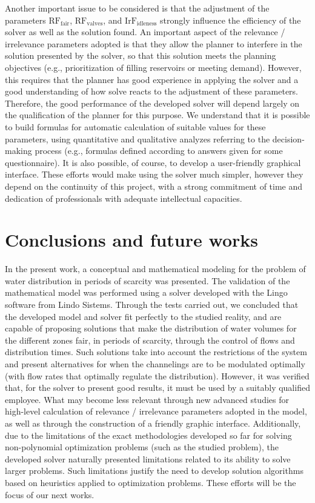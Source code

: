 \documentclass{singlecol}
\theoremstyle{TH}{
\newtheorem{lemma}{Lemma}
\newtheorem{theorem}[lemma]{Theorem}
\newtheorem{corrolary}[lemma]{Corrolary}
\newtheorem{conjecture}[lemma]{Conjecture}
\newtheorem{proposition}[lemma]{Proposition}
\newtheorem{claim}[lemma]{Claim}
\newtheorem{stheorem}[lemma]{Wrong Theorem}
\newtheorem{algorithm}{Algorithm}
}
\theoremstyle{THrm}{
\newtheorem{definition}{Definition}[section]
\newtheorem{question}{Question}[section]
\newtheorem{remark}{Remark}
\newtheorem{scheme}{Scheme}
}
\theoremstyle{THhit}{
\newtheorem{case}{Case}[section]
}
\begin{document}
Another important issue to be considered is that the adjustment of the parameters $\mathrm{RF_{fair}}$, $\mathrm{RF_{valves}}$, and $\mathrm{IrF_{idleness}}$ strongly influence the efficiency of the solver as well as the solution found. An important aspect of the relevance / irrelevance parameters adopted is that they allow the planner to interfere in the solution presented by the solver, so that this solution meets the planning objectives (e.g., prioritization of filling reservoirs or meeting demand). However, this requires that the planner has good experience in applying the solver and a good understanding of how solve reacts to the adjustment of these parameters. Therefore, the good performance of the developed solver will depend largely on the qualification of the planner for this purpose. We understand that it is possible to build formulas for automatic calculation of suitable values for these parameters, using quantitative and qualitative analyzes referring to the decision-making process (e.g., formulas defined according to answers given for some questionnaire). It is also possible, of course, to develop a user-friendly graphical interface. These efforts would make using the solver much simpler, however they depend on the continuity of this project, with a strong commitment of time and dedication of professionals with adequate intellectual capacities.

\section{Conclusions and future works}
\label{sec:conclusions}

In the present work, a conceptual and mathematical modeling for the problem of water distribution in periods of scarcity was presented. The validation of the mathematical model was performed using a solver developed with the Lingo software from Lindo Sistems. Through the tests carried out, we concluded that the developed model and solver fit perfectly to the studied reality, and are capable of proposing solutions that make the distribution of water volumes for the different zones fair, in periods of scarcity, through the control of flows and distribution times. Such solutions take into account the restrictions of the system and present alternatives for when the channelings are to be modulated optimally (with flow rates that optimally regulate the distribution). However, it was verified that, for the solver to present good results, it must be used by a suitably qualified employee. What may become less relevant through new advanced studies for high-level calculation of relevance / irrelevance parameters adopted in the model, as well as through the construction of a friendly graphic interface.  Additionally, due to the limitations of the exact methodologies developed so far for solving non-polynomial optimization problems (such as the studied problem), the developed solver naturally presented limitations related to its ability to solve larger problems. Such limitations justify the need to develop solution algorithms based on heuristics applied to optimization problems. These efforts will be the focus of our next works.
\end{document}
